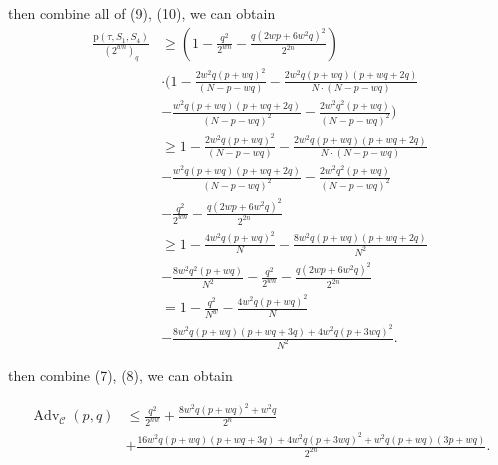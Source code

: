 \noindent then combine all of (9), (10), we can obtain
$$
\begin{aligned}
\frac{\mathrm{p}\left(\tau, S_{1}, S_{4}\right)}{\left(2^{w n}\right)_{q}} &\geq (1-\frac{q^{2}}{2^{w n}}-\frac{q\left(2 w p+6 w^{2} q\right)^{2}}{2^{2 n}})\\
&\cdot (1- \frac{2 w^{2} q (p+w q)^{2}}{(N-p-w q)} -\frac{2 w^{2} q (p+w q)(p+w q+2 q)}{N \cdot (N-p-w q)}\\
&- \frac{w^{2} q (p+w q)(p+w q+2 q)}{(N-p-w q)^2} - \frac{2 w^{2} q^{2} (p+w q)}{(N- p- wq)^2})\\
&\geq 1- \frac{2 w^{2} q (p+w q)^{2}}{(N-p-w q)} -\frac{2 w^{2} q (p+w q)(p+w q+2 q)}{N \cdot (N-p-w q)}\\
&- \frac{w^{2} q (p+w q)(p+w q+2 q)}{(N-p-w q)^2} - \frac{2 w^{2} q^{2} (p+w q)}{(N- p- wq)^2}\\
& -\frac{q^{2}}{2^{w n}}-\frac{q\left(2 w p+6 w^{2} q\right)^{2}}{2^{2 n}}\\
&\geq 1- \frac{4 w^2 q(p+wq)^2}{N} - \frac{8 w^2 q(p+w q)(p+w q +2 q)}{N^2}\\
&- \frac{8 w^2 q^2(p+w q)}{N^2} - \frac{q^{2}}{2^{w n}}-\frac{q\left(2 w p+6 w^{2} q\right)^{2}}{2^{2 n}}\\
&= 1 - \frac{q^2}{N^w} - \frac{4 w^2 q(p+wq)^2}{N}\\
&- \frac{8 w^2 q(p+w q)(p+w q +3 q)+4 w^2 q(p+3 wq)^2}{N^2}.
\end{aligned}
$$

\noindent then combine (7), (8), we can obtain

$$
\begin{aligned}
\operatorname{Adv}_{\mathcal{C}}\left(p, q\right) &\leq \frac{q^2}{2^{n w}} + \frac{8 w^2 q(p+wq)^2+w^2 q}{2^n}\\
&+ \frac{16 w^2 q(p+w q)(p+w q +3 q)+4 w^2 q(p+3 wq)^2+ w^2q(p+w q)(3p+w q)}{2^{2 n}}.
\end{aligned}
$$




